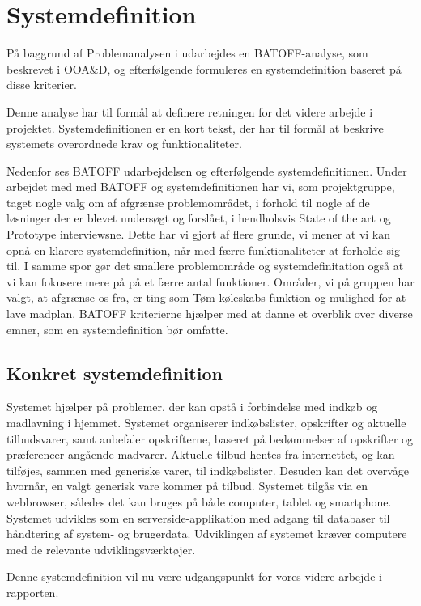 \section{Systemdefinition}
På baggrund af Problemanalysen i  udarbejdes en BATOFF-analyse, som beskrevet i OOA\&D\citep{OOA&D2001}, og efterfølgende formuleres en systemdefinition baseret på disse kriterier.

Denne analyse har til formål at definere retningen for det videre arbejde i projektet.
Systemdefinitionen er en kort tekst, der har til formål at beskrive systemets overordnede krav og funktionaliteter.

Nedenfor ses BATOFF udarbejdelsen og efterfølgende systemdefinitionen.
Under arbejdet med med BATOFF og systemdefinitionen har vi, som  projektgruppe, taget nogle valg om af afgrænse problemområdet, i forhold til nogle af de løsninger der er blevet undersøgt og forslået, i hendholsvis State of the art og Prototype interviewsne.
Dette har vi gjort af flere grunde, vi mener at vi kan opnå en klarere systemdefinition, når med færre funktionaliteter at forholde sig til.
I samme spor gør det smallere problemområde og systemdefinitation også at vi kan fokusere mere på på et færre antal funktioner.
Områder, vi på gruppen har valgt, at afgrænse os fra, er ting som  Tøm-køleskabs-funktion og mulighed for at lave madplan.
BATOFF kriterierne hjælper med at danne et overblik over diverse emner, som en systemdefinition bør omfatte.




\subsection{Konkret systemdefinition}\label{Sysdef}

Systemet hjælper på problemer, der kan opstå i forbindelse med indkøb og madlavning i hjemmet.
Systemet organiserer indkøbslister, opskrifter og aktuelle tilbudsvarer, samt anbefaler opskrifterne, baseret på bedømmelser af opskrifter og præferencer angående madvarer.
Aktuelle tilbud hentes fra internettet, og kan tilføjes, sammen med generiske varer, til indkøbslister.
Desuden kan det overvåge hvornår, en valgt generisk vare kommer på tilbud.
Systemet tilgås via en webbrowser, således det kan bruges på både computer, tablet og smartphone.
Systemet udvikles som en serverside-applikation med adgang til databaser til håndtering af system- og brugerdata.
Udviklingen af systemet kræver computere med de relevante udviklingsværktøjer.

Denne systemdefinition vil nu være udgangspunkt for vores videre arbejde i rapporten.
